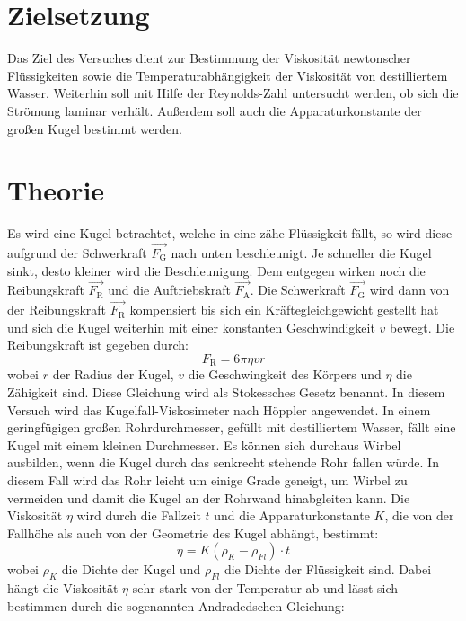 \section{Zielsetzung}
\label{sec:Zielsetzung}
Das Ziel des Versuches dient zur Bestimmung der Viskosität newtonscher Flüssigkeiten sowie die Temperaturabhängigkeit der Viskosität von destilliertem Wasser. Weiterhin soll mit Hilfe der Reynolds-Zahl untersucht werden, ob sich die Strömung laminar verhält. Außerdem soll auch die Apparaturkonstante der großen Kugel bestimmt werden.
\section{Theorie}
\label{sec:Theorie}
Es wird eine Kugel betrachtet, welche in eine zähe Flüssigkeit fällt, so wird diese aufgrund der Schwerkraft $\vec{F_\text{G}}$ nach unten beschleunigt. Je schneller die Kugel sinkt, desto kleiner wird die Beschleunigung. Dem entgegen wirken noch die Reibungskraft $\vec{F_\text{R}}$ und die Auftriebskraft $\vec{F_\text{A}}$. Die Schwerkraft $\vec{F_\text{G}}$ wird dann von der Reibungskraft $\vec{F_\text{R}}$ kompensiert bis sich ein Kräftegleichgewicht gestellt hat und sich die Kugel weiterhin mit einer konstanten Geschwindigkeit $v$ bewegt.
Die Reibungskraft ist gegeben durch:
\begin{equation}
F_\text{R} = 6\pi\eta v r
\end{equation}
wobei $r$ der Radius der Kugel, $v$ die Geschwingkeit des Körpers und $\eta$ die Zähigkeit sind. 
Diese Gleichung wird als Stokessches Gesetz benannt.
In diesem Versuch wird das Kugelfall-Viskosimeter nach Höppler angewendet. In einem geringfügigen großen Rohrdurchmesser, gefüllt mit destilliertem Wasser, fällt eine Kugel mit einem kleinen Durchmesser. Es können sich durchaus Wirbel ausbilden, wenn die Kugel durch das senkrecht stehende Rohr fallen würde. In diesem Fall wird das Rohr leicht um einige Grade geneigt, um Wirbel zu vermeiden und damit die Kugel an der Rohrwand hinabgleiten kann. Die Viskosität $\eta$ wird durch die Fallzeit $t$ und die Apparaturkonstante $K$, die von der Fallhöhe als auch von der Geometrie des Kugel abhängt, bestimmt:
\begin{equation*}
\label{Etat}
\eta=K\left(\rho_{K}-\rho_{Fl}\right)\cdot t
\end{equation*}
wobei $\rho_{K}$ die Dichte der Kugel und $\rho_{Fl}$ die Dichte der Flüssigkeit sind.
Dabei hängt die Viskosität $\eta$ sehr stark von der Temperatur ab und lässt sich bestimmen durch die sogenannten Andradedschen Gleichung:
